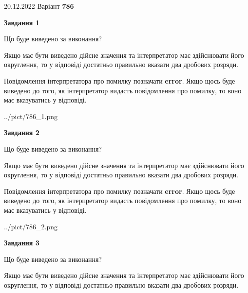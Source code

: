 \documentclass[12pt, ukrainian]{article}
\begin{document}
{20.12.2022 Варіант \No \textbf { 786 }\par}
{
\begin {Large}

{\begin {center}\textbf{Завдання 1}\end {center}}\par
Що буде виведено за виконання? \par

Якщо має бути виведено дійсне значення та інтерпретатор має здійснювати його округлення, 
то у відповіді достатньо правильно вказати два дробових розряди.

Повідомлення інтерпретатора про помилку позначати \textbf{error}.
Якщо щось буде виведено до того, як інтерпретатор видасть повідомлення про помилку, 
то воно має вказуватись у відповіді. \par

\begin{center}
	{../pict/786_1.png}
\end{center}
\newpage

{\begin {center}\textbf{Завдання 2}\end {center}}\par
Що буде виведено за виконання? \par

Якщо має бути виведено дійсне значення та інтерпретатор має здійснювати його округлення, 
то у відповіді достатньо правильно вказати два дробових розряди.

Повідомлення інтерпретатора про помилку позначати \textbf{error}.
Якщо щось буде виведено до того, як інтерпретатор видасть повідомлення про помилку, 
то воно має вказуватись у відповіді. \par

\begin{center}
	{../pict/786_2.png}
\end{center}
\newpage

{\begin {center}\textbf{Завдання 3}\end {center}}\par
Що буде виведено за виконання? \par

Якщо має бути виведено дійсне значення та інтерпретатор має здійснювати його округлення, 
то у відповіді достатньо правильно вказати два дробових розряди.


\end{Large}}
\end{document}
